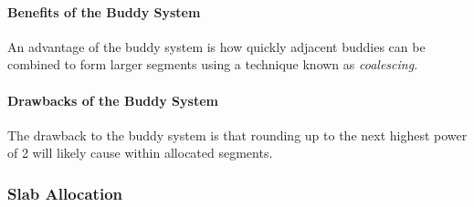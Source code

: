 \paragraph{Benefits of the Buddy System}\label{par:Buddy_System_Benefits}
An advantage of the buddy system is how quickly adjacent buddies can be combined to form larger segments using a technique known as \emph{coalescing}.

\paragraph{Drawbacks of the Buddy System}\label{par:Buddy_System_Drawbacks}
The drawback to the buddy system is that rounding up to the next highest power of 2 will likely cause  within allocated segments.

\subsubsection{Slab Allocation}\label{subsubsec:Slab_Allocation}

